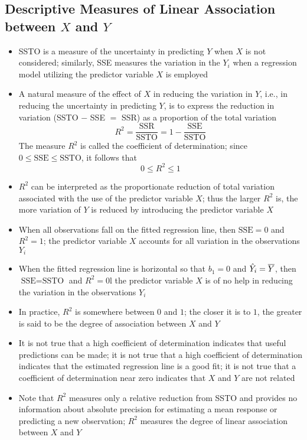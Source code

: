 \subsection{Descriptive Measures of Linear Association between $X$ and $Y$}
\begin{itemize}
\item SSTO is a measure of the uncertainty in predicting $Y$ when $X$ is not considered; similarly, SSE measures the variation in the $Y_i$ when a regression model utilizing the predictor variable $X$ is employed 
\item A natural measure of the effect of $X$ in reducing the variation in $Y$, i.e., in reducing the uncertainty in predicting $Y$, is to express the reduction in variation (SSTO $-$ SSE $=$ SSR) as a proportion of the total variation
$$ R^2 = \frac{\text{SSR}}{\text{SSTO}} = 1 - \frac{\text{SSE}}{\text{SSTO}} $$ The measure $R^2$ is called the coefficient of determination; since $0 \leq \text{SSE} \leq \text{SSTO}$, it follows that $$ 0 \leq R^2 \leq 1 $$ 
\item $R^2$ can be interpreted as the proportionate reduction of total variation associated with the use of the predictor variable $X$; thus the larger $R^2$ is, the more variation of $Y$ is reduced by introducing the predictor variable $X$ 
\item When all observations fall on the fitted regression line, then $\text{SSE} = 0$ and $R^2 = 1$; the predictor variable $X$ accounts for all variation in the observations $Y_i$
\item When the fitted regression line is horizontal so that $b_1 = 0$ and $\hat{Y}_i = \overline{Y}$, then $\text{SSE} = \text{SSTO}$ and $R^2=0$l the predictor variable $X$ is of no help in reducing the variation in the observations $Y_i$ 
\item In practice, $R^2$ is somewhere between $0$ and $1$; the closer it is to $1$, the greater is said to be the degree of association between $X$ and $Y$
\item It is not true that a high coefficient of determination indicates that useful predictions can be made; it is not true that a high coefficient of determination indicates that the estimated regression line is a good fit; it is not true that a coefficient of determination near zero indicates that $X$ and $Y$ are not related 
\item Note that $R^2$ measures only a relative reduction from SSTO and provides no information about absolute precision for estimating a mean response or predicting a new observation; $R^2$ measures the degree of linear association between $X$ and $Y$

\end{itemize}
